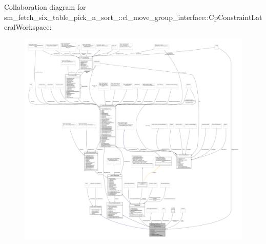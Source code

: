 Collaboration diagram for sm\+\_\+fetch\+\_\+six\+\_\+table\+\_\+pick\+\_\+n\+\_\+sort\+\_\+:\+:cl\+\_\+move\+\_\+group\+\_\+interface\+:\+:Cp\+Constraint\+Lateral\+Workspace\+:
\nopagebreak
\begin{figure}[H]
\begin{center}
\leavevmode
\includegraphics[width=350pt]{classsm__fetch__six__table__pick__n__sort__1_1_1cl__move__group__interface_1_1CpConstraintLateralWorkspace__coll__graph}
\end{center}
\end{figure}
